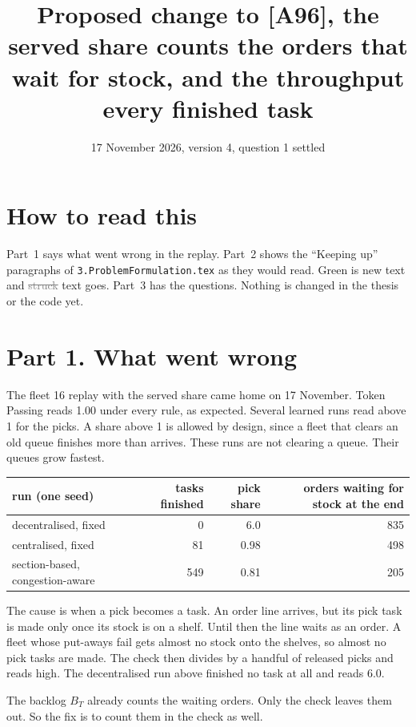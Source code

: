\documentclass[11pt,a4paper]{article}
\title{Proposed change to [A96], the served share counts the orders that wait for stock, and the throughput every finished task}
\date{17 November 2026, version 4, question 1 settled}
\newcommand{\new}[1]{\textcolor{newc}{#1}}
\newcommand{\old}[1]{\textcolor{gray}{\sout{#1}}}
\begin{document}
\maketitle

\section*{How to read this}
Part~1 says what went wrong in the replay. Part~2 shows the ``Keeping up'' paragraphs of
\texttt{3.ProblemFormulation.tex} as they would read. \new{Green} is new text and \old{struck} text
goes. Part~3 has the questions. Nothing is changed in the thesis or the code yet.

\section*{Part 1. What went wrong}

The fleet 16 replay with the served share came home on 17 November. Token Passing reads 1.00 under
every rule, as expected. Several learned runs read above 1 for the picks. A share above 1 is allowed
by design, since a fleet that clears an old queue finishes more than arrives. These runs are not
clearing a queue. Their queues grow fastest.

\begin{center}
\begin{tabular}{lrrr}
  \toprule
  run (one seed) & tasks finished & pick share & orders waiting for stock at the end \\
  \midrule
  decentralised, fixed & 0 & 6.0 & 835 \\
  centralised, fixed & 81 & 0.98 & 498 \\
  section-based, congestion-aware & 549 & 0.81 & 205 \\
  \bottomrule
\end{tabular}
\end{center}

The cause is when a pick becomes a task. An order line arrives, but its pick task is made only once
its stock is on a shelf. Until then the line waits as an order. A fleet whose put-aways fail gets
almost no stock onto the shelves, so almost no pick tasks are made. The check then divides by a
handful of released picks and reads high. The decentralised run above finished no task at all and
reads 6.0.

The backlog $B_T$ already counts the waiting orders. Only the check leaves them out. So the fix is to
count them in the check as well.
\end{document}
